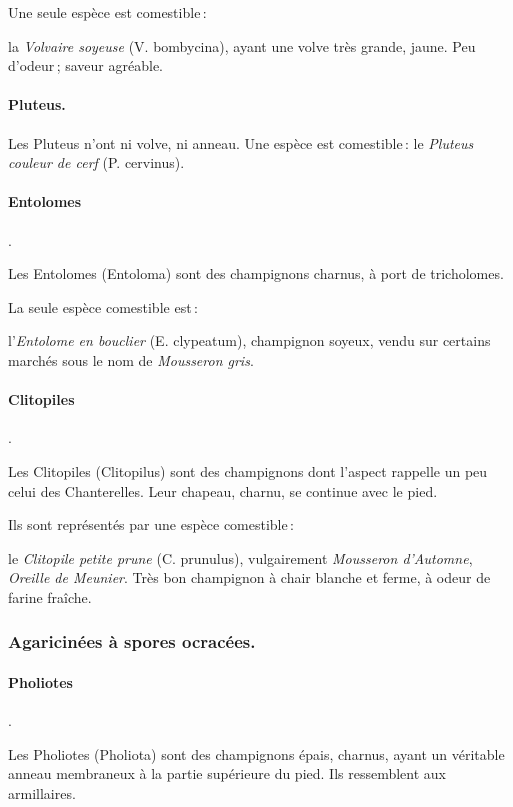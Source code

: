 Une seule espèce est comestible :

la \textit{Volvaire soyeuse} (V. bombycina), ayant une volve très grande,
jaune. Peu d'odeur ; saveur agréable.

\paragraph{Pluteus.}

Les Pluteus n'ont ni volve, ni anneau.
Une espèce est comestible :
le \textit{Pluteus couleur de cerf} (P. cervinus).

\paragraph{Entolomes}.

Les Entolomes (Entoloma) sont des champignons charnus, à port de tricholomes.

La seule espèce comestible est :

l'\textit{Entolome en bouclier} (E. clypeatum), champignon soyeux, vendu sur
certains marchés sous le nom de \textit{Mousseron gris}.

\paragraph{Clitopiles}.

Les Clitopiles (Clitopilus) sont des champignons dont l'aspect rappelle un peu
celui des Chanterelles. Leur chapeau, charnu, se continue avec le pied.

Ils sont représentés par une espèce comestible :

le \textit{Clitopile petite prune} (C. prunulus), vulgairement
\textit{Mousseron d'Automne}, \textit{Oreille de Meunier}. Très bon champignon
à chair blanche et ferme, à odeur de farine fraîche.

\subsubsection*{\centering \small\sc Agaricinées à spores ocracées.}

\paragraph{Pholiotes}.

Les Pholiotes (Pholiota) sont des champignons épais, charnus, ayant un
véritable anneau membraneux à la partie supérieure du pied. Ils ressemblent aux
armillaires.

